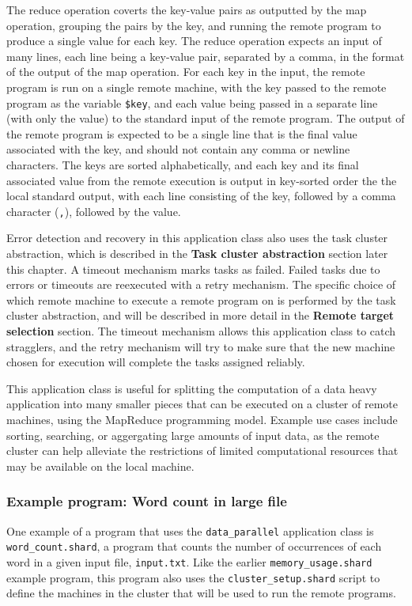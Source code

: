 \documentclass[twoside]{report}
\begin{document}
The reduce operation coverts the key-value pairs as outputted by the map operation, grouping the pairs by the key, and running the remote program to produce a single value for each key.
The reduce operation expects an input of many lines, each line being a key-value pair, separated by a comma, in the format of the output of the map operation.
For each key in the input, the remote program is run on a single remote machine, with the key passed to the remote program as the variable \texttt{\$key}, and each value being passed in a separate line (with only the value) to the standard input of the remote program.
The output of the remote program is expected to be a single line that is the final value associated with the key, and should not contain any comma or newline characters.
The keys are sorted alphabetically, and each key and its final associated value from the remote execution is output in key-sorted order the the local standard output, with each line consisting of the key, followed by a comma character (\texttt{,}), followed by the value.

Error detection and recovery in this application class also uses the task cluster abstraction, which is described in the \textbf{Task cluster abstraction} section later this chapter.
A timeout mechanism marks tasks as failed.
Failed tasks due to errors or timeouts are reexecuted with a retry mechanism.
The specific choice of which remote machine to execute a remote program on is performed by the task cluster abstraction, and will be described in more detail in the \textbf{Remote target selection} section.
The timeout mechanism allows this application class to catch stragglers, and the retry mechanism will try to make sure that the new machine chosen for execution will complete the tasks assigned reliably.

This application class is useful for splitting the computation of a data heavy application into many smaller pieces that can be executed on a cluster of remote machines, using the MapReduce programming model.
Example use cases include sorting, searching, or aggergating large amounts of input data, as the remote cluster can help alleviate the restrictions of limited computational resources that may be available on the local machine.

\subsubsection{Example program: Word count in large file}

One example of a program that uses the \texttt{data\_parallel} application class is \texttt{word\_count.shard}, a program that counts the number of occurrences of each word in a given input file, \texttt{input.txt}.
Like the earlier \texttt{memory\_usage.shard} example program, this program also uses the \texttt{cluster\_setup.shard} script to define the machines in the cluster that will be used to run the remote programs.
\end{document}
